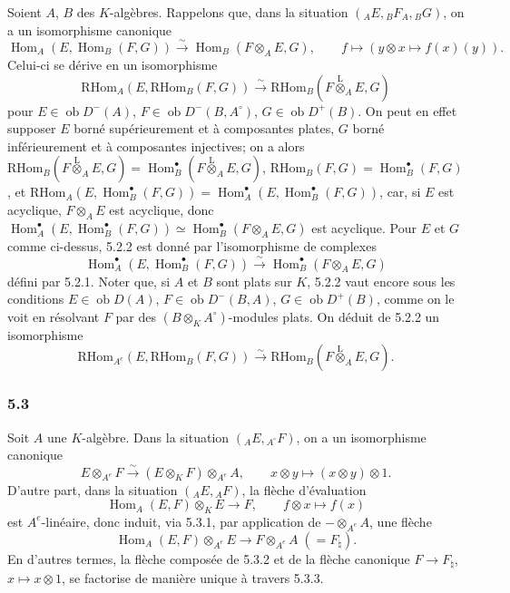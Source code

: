 \documentclass[11pt]{article}
\DeclareMathOperator{\Hom}{Hom}
\newcommand{\ob}{\operatorname{ob}}
\providecommand{\RHom}{\mathrm{RHom}}
\providecommand{\lten}{\overset{\mathrm L}{\otimes}}
\providecommand{\RHom}{\mathrm{RHom}}
\providecommand{\Hom}{\operatorname{Hom}}
\providecommand{\ob}{\operatorname{ob}}
\providecommand{\lten}{\overset{\mathrm L}{\otimes}}
\providecommand{\RHom}{\mathrm R\mathcal{H}om}
\providecommand{\lten}{\overset{\mathrm L}{\otimes}}
\providecommand{\lten}{\overset{\mathrm L}{\otimes}}
\providecommand{\lten}{\overset{\mathrm L}{\otimes}}
\providecommand{\lten}{\overset{\mathrm L}{\otimes}}
\begin{document}
Soient $A$, $B$ des $K$-algèbres. Rappelons que, dans la situation $({}_AE,{}_BF_A,{}_BG)$, on a un isomorphisme canonique
\begin{equation}\tag{5.2.1}
\Hom_A(E,\Hom_B(F,G))\xrightarrow{\sim}\Hom_B(F\otimes_AE,G),\qquad
f\longmapsto (y\otimes x\longmapsto f(x)(y)).
\end{equation}
Celui-ci se dérive en un isomorphisme
\begin{equation}\tag{5.2.2}
\RHom_A(E,\RHom_B(F,G))\xrightarrow{\sim}\RHom_B(F\lten_AE,G)
\end{equation}
pour $E\in\ob D^-(A)$, $F\in\ob D^-(B,A^\circ)$, $G\in\ob D^+(B)$. On peut en effet supposer $E$ borné supérieurement et à composantes plates, $G$ borné inférieurement et à composantes injectives; on a alors $\RHom_B(F\lten_AE,G)=\Hom_B^\bullet(F\lten_AE,G)$, $\RHom_B(F,G)=\Hom_B^\bullet(F,G)$, et $\RHom_A(E,\Hom_B^\bullet(F,G))=\Hom_A^\bullet(E,\Hom_B^\bullet(F,G))$, car, si $E$ est acyclique, $F\otimes_AE$ est acyclique, donc $\Hom_A^\bullet(E,\Hom_B^\bullet(F,G))\simeq\Hom_B^\bullet(F\otimes_AE,G)$ est acyclique. Pour $E$ et $G$ comme ci-dessus, 5.2.2 est donné par l'isomorphisme de complexes
\[
\Hom_A^\bullet(E,\Hom_B^\bullet(F,G))\xrightarrow{\sim}\Hom_B^\bullet(F\otimes_AE,G)
\]
défini par 5.2.1. Noter que, si $A$ et $B$ sont plats sur $K$, 5.2.2 vaut encore sous les conditions $E\in\ob D(A)$, $F\in\ob D^-(B,A)$, $G\in\ob D^+(B)$, comme on le voit en résolvant $F$ par des $(B\otimes_KA^\circ)$-modules plats. On déduit de 5.2.2 un isomorphisme
\begin{equation}\tag{5.2.3}
\RHom_{A^e}(E,\RHom_B(F,G))\xrightarrow{\sim}\RHom_B(F\lten_AE,G).
\end{equation}

\subsubsection*{5.3}

Soit $A$ une $K$-algèbre. Dans la situation $({}_AE,{}_{A^\circ}F)$, on a un isomorphisme canonique
\begin{equation}\tag{5.3.1}
E\otimes_{A^e}F\xrightarrow{\sim}(E\otimes_KF)\otimes_{A^e}A,
\qquad x\otimes y\longmapsto (x\otimes y)\otimes 1.
\end{equation}
D'autre part, dans la situation $({}_AE,{}_AF)$, la flèche d'évaluation
\begin{equation}\tag{5.3.2}
\Hom_A(E,F)\otimes_KE\longrightarrow F,
\qquad f\otimes x\longmapsto f(x)
\end{equation}
est $A^e$-linéaire, donc induit, via 5.3.1, par application de $-\otimes_{A^e}A$, une flèche
\begin{equation}\tag{5.3.3}
\Hom_A(E,F)\otimes_{A^e}E\longrightarrow F\otimes_{A^e}A\;(=F_\natural).
\end{equation}
En d'autres termes, la flèche composée de 5.3.2 et de la flèche canonique $F\to F_\natural$, $x\mapsto x\otimes 1$, se factorise de manière unique à travers 5.3.3.
\end{document}
